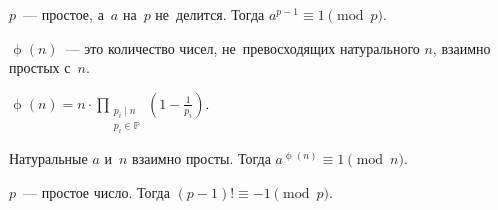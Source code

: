 


\begingroup
    \ifdefined\mathup
        \def\eulerphi{\mathup{\phi}}%
    \else
        \def\eulerphi{\upphi}%
    \fi
    \def\divides{\mathrel{\vert}}%

$p$~--- простое, а~$a$ на~$p$ не~делится.
Тогда $a^{p-1} \equiv 1 \pmod{p}$.

$\eulerphi(n)$~--- это количество чисел, не~превосходящих натурального $n$,
взаимно простых с~$n$.

\( \displaystyle
    \eulerphi(n)
=
    n \cdot
    \prod\limits_{\substack{
        p_i \divides n_{\phantom{i}} \\
        p_i \in \mathbb{P}
    }}
        \left( 1 - \frac{1}{p_i} \right)
\).

Натуральные $a$ и~$n$ взаимно просты.
Тогда $a^{\eulerphi(n)} \equiv 1 \pmod{n}$.

$p$~--- простое число.
Тогда $(p - 1)! \equiv -1 \pmod{p}$.

